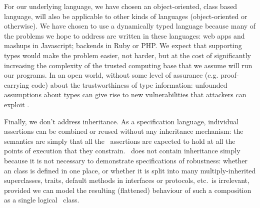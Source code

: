 
For our underlying language, we have chosen an object-oriented, class based language,
 will also be
applicable to other kinds of languages (object-oriented or
otherwise).
%
We have chosen to use a dynamically typed language because many of the
problems we hope to address are written in these
languages: web apps and mashups in Javascript; backends in Ruby or
PHP.  We expect that supporting types would make the problem easier,
not harder, but at the cost of significantly increasing the complexity
of the trusted computing base that we assume will run our programs. In
an open world, without some level of assurance (e.g. proof-carrying
code) about the trustworthiness of type information: unfounded
assumptions about types can give rise to new vulnerabilities that
attackers can exploit \cite{pickles}.

Finally, we don't address inheritance. As a specification language,
individual \Chainmail assertions can be combined or reused without any
inheritance mechanism: the semantics are simply that all
the \Chainmail\ assertions are expected to hold at all the points of
execution that they constrain.  \LangOO\ does not contain inheritance
simply because it is not necessary to demonstrate specifications of
robustness: whether an \LangOO class is defined in one place, or
whether it is split into many multiply-inherited superclasses, traits,
default methods in interfaces or protocols, etc.\ is irrelevant,
provided we can model the resulting (flattened) behaviour of such a
composition as a single logical \LangOO\ class.

